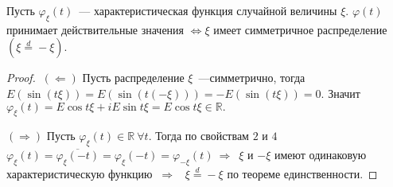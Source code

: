 	\begin{property}
		Пусть $\varphi_\xi(t)$~--- характеристическая функция случайной величины $\xi$. $\varphi(t)$ принимает действительные значения $\Leftrightarrow \xi$ имеет симметричное распределение $(\xi \overset{d}{=} -\xi)$.
		\begin{proof}
			$~(\Leftarrow)$ Пусть распределение $\xi$~---симметрично, тогда $E(\sin(t\xi)) = E(\sin(t(-\xi))) = -E(\sin(t\xi)) = 0.$ Значит $\varphi_\xi(t) = E\cos t\xi + iE\sin t\xi = E\cos t\xi \in \mathbb{R}.$

			$(\Rightarrow)$ Пусть $\varphi_\xi(t) \in \mathbb{R} ~\forall t.$ Тогда по свойствам $2$ и $4$ $\varphi_\xi(t) = \overline{\varphi_\xi(-t)} = \varphi_\xi(-t) = \varphi_{-\xi}(t) ~\Rightarrow $~$\xi$ и $-\xi$ имеют одинаковую характеристическую функцию $~\Rightarrow$~ $\xi \overset{d}{=} -\xi$ по теореме единственности.
		\end{proof}
	\end{property}

